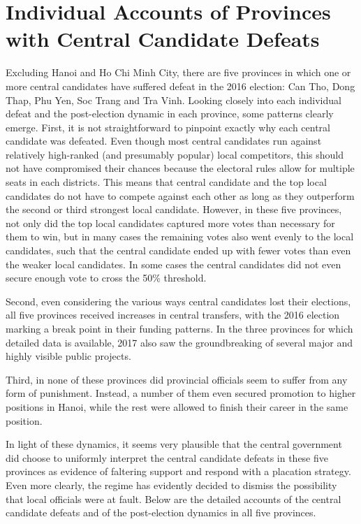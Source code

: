 \documentclass[12pt]{article}
\newcommand{\1}{\mathbbm{1}}
\begin{document}
\clearpage

\section{Individual Accounts of Provinces with Central Candidate Defeats}
\label{app:qualitative}

Excluding Hanoi and Ho Chi Minh City, there are five provinces in which one or more central candidates have suffered defeat in the 2016 election: Can Tho, Dong Thap, Phu Yen, Soc Trang and Tra Vinh. Looking closely into each individual defeat and the post-election dynamic in each province, some patterns clearly emerge. First, it is not straightforward to pinpoint exactly why each central candidate was defeated. Even though most central candidates run against relatively high-ranked (and presumably popular) local competitors, this should not have compromised their chances because the electoral rules allow for multiple seats in each districts. This means that central candidate and the top local candidates do not have to compete against each other as long as they outperform the second or third strongest local candidate. However, in these five provinces, not only did the top local candidates captured more votes than necessary for them to win, but in many cases the remaining votes also went evenly to the local candidates, such that the central candidate ended up with fewer votes than even the weaker local candidates. In some cases the central candidates did not even secure enough vote to cross the 50\% threshold.

Second, even considering the various ways central candidates lost their elections, all five provinces received increases in central transfers, with the 2016 election marking a break point in their funding patterns. In the three provinces for which detailed data is available, 2017 also saw the groundbreaking of several major and highly visible public projects.

Third, in none of these provinces did provincial officials seem to suffer from any form of punishment. Instead, a number of them even secured promotion to higher positions in Hanoi, while the rest were allowed to finish their career in the same position.

In light of these dynamics, it seems very plausible that the central government did choose to uniformly interpret the central candidate defeats in these five provinces as evidence of faltering support and respond with a placation strategy. Even more clearly, the regime has evidently decided to dismiss the possibility that local officials were at fault. Below are the detailed accounts of the central candidate defeats and of the post-election dynamics in all five provinces.
\end{document}
